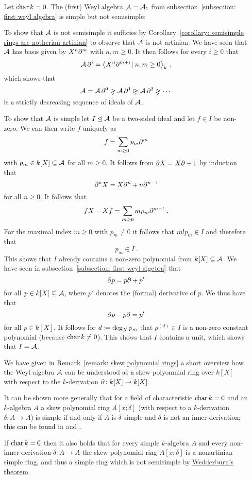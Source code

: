 \begin{example}
  \label{example: simple but not semisimple}
  Let $\operatorname{char} k = 0$.
  The (first) Weyl algebra $\operatorname{\mathcal{A}} = \operatorname{\mathcal{A}}_1$ from subsection~\ref{subsection: first weyl algebra} is simple but not semisimple:
  
  To show that $\operatorname{\mathcal{A}}$ is not semisimple it sufficies by Corollary~\ref{corollary: semisimple rings are notherian artinian} to observe that $\operatorname{\mathcal{A}}$ is not artinian:
  We have seen that $\operatorname{\mathcal{A}}$ has basis given by $X^n \partial^m$ with $n, m \geq 0$.
  It then follows for every $i \geq 0$ that
  \[
      \weyl \del^i
    = \gen{ X^n \del^{m+i} \suchthat n, m \geq 0 }_k \,,
  \]
  which shows that
  \[
                \weyl
    =           \weyl \del^0
    \idealgneq  \weyl \del^1
    \idealgneq  \weyl \del^2
    \idealgneq  \dotsb
  \]
  is a strictly decreasing sequence of ideals of $\operatorname{\mathcal{A}}$.
  
  To show that $\operatorname{\mathcal{A}}$ is simple let $I \trianglelefteq \operatorname{\mathcal{A}}$ be a two-sided ideal and let $f \in I$ be non-zero.
  We can then write $f$ uniquely as
  \[
      f
    = \sum_{m \geq 0} p_m \partial^m
  \]
  with $p_m \in k[X] \subseteq \operatorname{\mathcal{A}}$ for all $m \geq 0$.
  It follows from $\partial X = X \partial + 1$ by induction that 
  \[
      \partial^n X
    = X \partial^n + n \partial^{n-1}
  \]
  for all $n \geq 0$.
  It follows that
  \[
      f X - X f
    = \sum_{m \geq 0} m p_m \partial^{m-1} \,.
  \]
  For the maximal index $m \geq 0$ with $p_m \neq 0$ it follows that $m! p_m \in I$ and therefore that
  \[
    p_m \in I \,.
  \]
  This shows that $I$ already contains a non-zero polynomial from $k[X] \subseteq \operatorname{\mathcal{A}}$.
  We have seen in subsection~\ref{subsection: first weyl algebra} that
  \[
    \partial p = p \partial + p'
  \]
  for all $p \in k[X] \subseteq \operatorname{\mathcal{A}}$, where $p'$ denotes the (formal) derivative of $p$.
  We thus have that
  \[
      \partial p - p \partial
    = p'
  \]
  for all $p \in k[X]$.
  It follows for $d \coloneqq \deg_X p_m$ that $p^{(d)} \in I$ is a non-zero constant polynomial (because $\operatorname{char} k \neq 0$).
  This shows that $I$ contains a unit, which shows that $I = \operatorname{\mathcal{A}}$.
\end{example}


\begin{remark}
  We have given in Remark~\ref{remark: skew polynomial rings} a short overview how the Weyl algebra $\operatorname{\mathcal{A}}$ can be understood as a skew polyonmial ring over $k[X]$ with respect to the $k$-derivation $\partial \colon k[X] \to k[X]$.
  
  It can be shown more generally that for a field of characteristic $\operatorname{char} k = 0$ and an $k$-algebra $A$ a skew polynomial ring $A[x;\delta]$ (with respect to a $k$-derivation $\delta \colon A \to A$) is simple if and only if $A$ is $\delta$-simple and $\delta$ is not an inner derivation;
  this can be found in \cite[Theorem~3.15]{Lam1991First} and \cite[Proposition~2.1]{NoncommutativeNoetherian}.
  
  If $\operatorname{char} k = 0$ then it also holds that for every simple $k$-algebra $A$ and every non-inner derivation $\delta \colon A \to A$ the skew polynomial ring $A[x;\delta]$ is a nonartinian simple ring, and thus a simple ring which is not semisimple by \hyperref[theorem: wedderburns theorem]{Wedderburn’s theorem}.
\end{remark}


